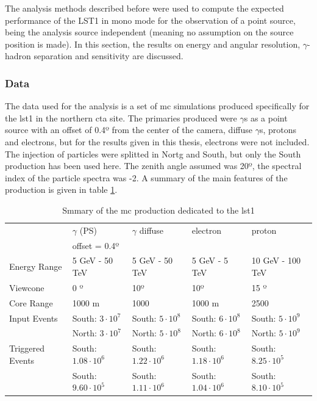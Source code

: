 \documentclass[main.tex]{subfiles}
\begin{document}
The analysis methods described before were used to compute the expected performance of the LST1 in mono mode for the observation of a point source, being the analysis source independent (meaning no assumption on the source position is made). In this section, the results on energy and angular resolution, $\gamma$-hadron separation and sensitivity are discussed.

\subsubsection{Data} \label{sec:mcdata}

The data used for the analysis is a set of \gls{mc} simulations produced specifically for the \gls{lst}1 in the northern \gls{cta} site. The primaries produced were $\gamma$s as a point source with an offset of 0.4º from the center of the camera, diffuse $\gamma$s, protons and electrons, but for the results given in this thesis, electrons were not included. The injection of particles were splitted in Nortg and South, but only the South production has been used here. The zenith angle assumed was 20º, the spectral index of the particle spectra was -2. A summary of the main features of the production is given in table \ref{tab:mcprod}.

\begin{table}
  \centering
    \begin{tabular}{|l|l|l|l|l|}
      \hline
      & $\gamma$ (PS) & $\gamma$ diffuse & electron & proton\\
       & offset = 0.4º & & & \\
      \hline
      Energy Range & 5 GeV - 50 TeV & 5 GeV - 50 TeV & 5 GeV - 5 TeV & 10 GeV - 100 TeV\\
      Viewcone     & 0 º  & 10º & 10º & 15 º \\
      Core Range  & 1000 m & 1000 & 1000 m & 2500 \\
      Input Events & South: $3\cdot 10^7$ & South: $5\cdot 10^8$ & South: $6\cdot 10^8$ & South: $5\cdot 10^9$ \\
      & North: $3\cdot 10^7$ & North: $5\cdot 10^8$ & North: $6\cdot 10^8$ & North: $5\cdot 10^9$ \\
      Triggered Events & South: $1.08\cdot 10^6 $ & South: $1.22\cdot 10^6 $ & South: $1.18\cdot 10^6 $ & South: $8.25\cdot 10^5 $ \\
      & South: $9.60\cdot 10^5 $ & South: $1.11\cdot 10^6 $ & South: $1.04\cdot 10^6 $ & South: $8.10\cdot 10^5 $ \\
      \hline
      \end{tabular}
  \caption{Smmary of the \gls{mc} production dedicated to the \gls{lst}1}\label{tab:mcprod}
\end{table}
\end{document}
